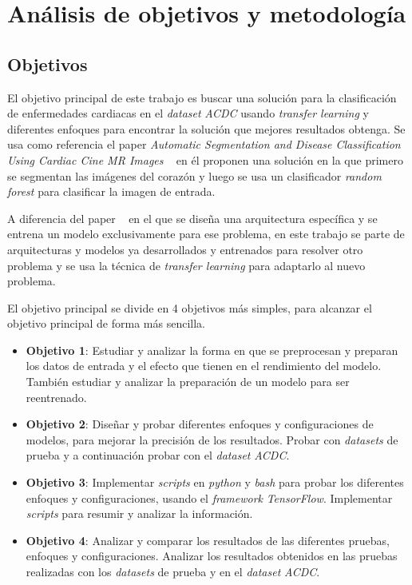 \documentclass[12pt,a4paper]{article}
\begin{document}

\newpage
\section{Análisis de objetivos y metodología}
\subsection{Objetivos}
El objetivo principal de este trabajo es buscar una solución para la clasificación de enfermedades cardiacas en el \textit{dataset} \textit{ACDC} usando \textit{transfer learning} y diferentes enfoques para encontrar la solución que mejores resultados obtenga. Se usa como referencia el paper \textit{Automatic Segmentation and Disease Classification Using Cardiac Cine MR Images} ~\cite{DBLP:journals/corr/abs-1708-01141} en él proponen una solución en la que primero se segmentan las imágenes del corazón y luego se usa un clasificador \textit{random forest} para clasificar la imagen de entrada.
\bigskip

A diferencia del paper ~\cite{DBLP:journals/corr/abs-1708-01141} en el que se diseña una arquitectura específica y se entrena un modelo exclusivamente para ese problema, en este trabajo se parte de arquitecturas y modelos ya desarrollados y entrenados para resolver otro problema y se usa la técnica de \textit{transfer learning} para adaptarlo al nuevo problema.
\bigskip

El objetivo principal se divide en 4 objetivos más simples, para alcanzar el objetivo principal de forma más sencilla.

\begin{itemize}
\item \textbf{Objetivo 1}: Estudiar y analizar la forma en que se preprocesan y preparan los datos de entrada y el efecto que tienen en el rendimiento del modelo. También estudiar y analizar la preparación de un modelo para ser reentrenado.

\item \textbf{Objetivo 2}: Diseñar y probar diferentes enfoques y configuraciones de modelos, para mejorar la precisión de los resultados. Probar con \textit{datasets} de prueba y a continuación probar con el \textit{dataset} \textit{ACDC}.

\item \textbf{Objetivo 3}: Implementar \textit{scripts} en \textit{python} y \textit{bash} para probar los diferentes enfoques y configuraciones, usando el \textit{framework} \textit{TensorFlow}. Implementar \textit{scripts} para resumir y analizar la información.

\item \textbf{Objetivo 4}: Analizar y comparar los resultados de las diferentes pruebas, enfoques y configuraciones. Analizar los resultados obtenidos en las pruebas realizadas con los \textit{datasets} de prueba y en el \textit{dataset} \textit{ACDC}.
\end{itemize}
\end{document}
